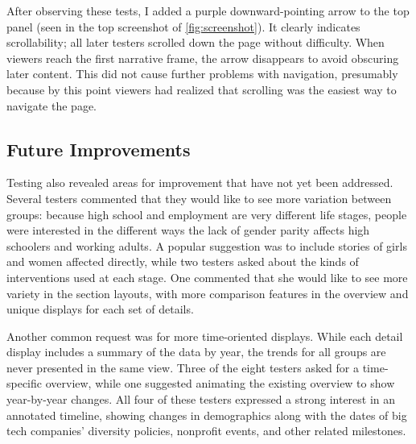 After observing these tests, I added a purple downward-pointing arrow to the top panel (seen in the top screenshot of \autoref{fig:screenshot}). It clearly indicates scrollability; all later testers scrolled down the page without difficulty. When viewers reach the first narrative frame, the arrow disappears to avoid obscuring later content. This did not cause further problems with navigation, presumably because by this point viewers had realized that scrolling was the easiest way to navigate the page.

\subsection{Future Improvements}
Testing also revealed areas for improvement that have not yet been addressed. Several testers commented that they would like to see more variation between groups: because high school and employment are very different life stages, people were interested in the different ways the lack of gender parity affects high schoolers and working adults. A popular suggestion was to include stories of girls and women affected directly, while two testers asked about the kinds of interventions used at each stage. One commented that she would like to see more variety in the section layouts, with more comparison features in the overview and unique displays for each set of details.

Another common request was for more time-oriented displays. While each detail display includes a summary of the data by year, the trends for all groups are never presented in the same view. Three of the eight testers asked for a time-specific overview, while one suggested animating the existing overview to show year-by-year changes. All four of these testers expressed a strong interest in an annotated timeline, showing changes in demographics along with the dates of big tech companies' diversity policies, nonprofit events, and other related milestones.
